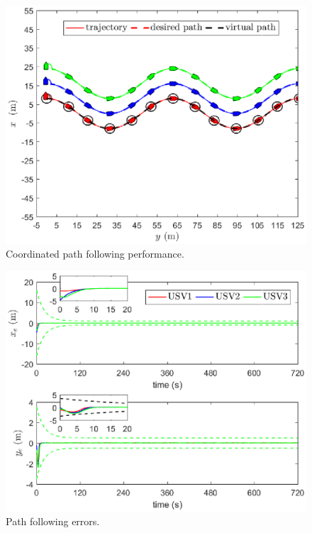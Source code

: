 \documentclass[a4paper,fleqn]{cas-dc}
\begin{document}
\begin{figure}[!htb]
	\centering
	\includegraphics[width=\hsize]{map.eps}
	\caption{Coordinated path following performance.}
	\label{fig3}
\end{figure}
\begin{figure}[!htb]
	\centering
	\includegraphics[width=\hsize]{CPFerror.eps}
	\caption{Path following errors.}
	\label{fig4}
\end{figure}
\end{document}

